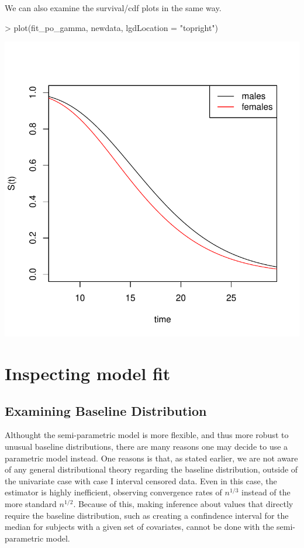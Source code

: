 \documentclass[a4paper]{article}
\begin{document}
  We can also examine the survival/cdf plots in the same way. 
  
\begin{Schunk}
\begin{Sinput}
> plot(fit_po_gamma, newdata, lgdLocation = "topright")
\end{Sinput}
\end{Schunk}
\includegraphics{icenReg-012}

\section{Inspecting model fit}

\subsection{Examining Baseline Distribution}
  
Althought the semi-parametric model is more flexible, and thus more robust to unusual baseline distributions, there are many reasons one may decide to use a parametric model instead. One reasons is that, as stated earlier, we are not aware of any general distributional theory regarding the baseline distribution, outside of the univariate case with case I interval censored data. Even in this case, the estimator is highly inefficient, observing convergence rates of $n^{1/3}$ instead of the more standard $n^{1/2}$. Because of this, making inference about values that directly require the baseline distribution, such as creating a confindence interval for the median for subjects with a given set of covariates, cannot be done with the semi-parametric model. 
  
\end{document}
